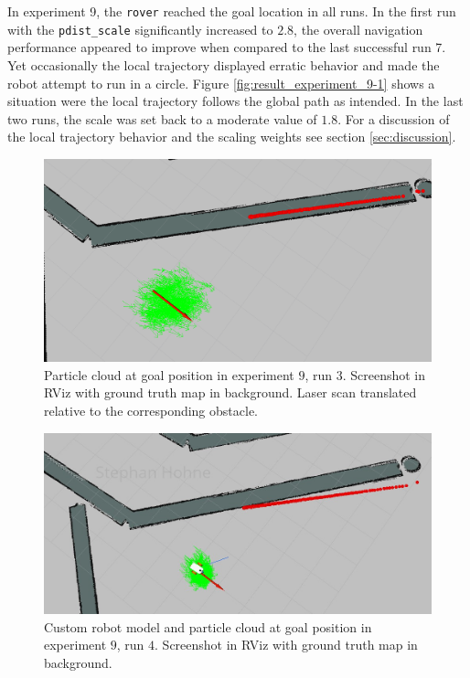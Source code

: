 \documentclass[10pt,journal,compsoc]{IEEEtran}
\begin{document}
In experiment 9, the \texttt{rover} reached the goal location in all runs. In the first run with the \texttt{pdist\_scale} significantly increased to $2.8$, the overall navigation performance appeared to improve when compared to the last successful run 7. Yet occasionally the local trajectory displayed erratic behavior and made the robot attempt to run in a circle. Figure \ref{fig:result_experiment_9-1} shows a situation were the local trajectory follows the global path as intended. In the last two runs, the scale was set back to a moderate value of $1.8$. For a discussion of the local trajectory behavior and the scaling weights see section \ref{sec:discussion}.
\begin{figure}[thpb]
	\centering
    \includegraphics[width=\linewidth]{images/exp9_run3_goal.PNG}
    \caption{Particle cloud at goal position in experiment $9$, run $3$. Screenshot in RViz with ground truth map in background. Laser scan translated relative to the corresponding obstacle.}
    \label{fig:result_experiment_9-3}
\end{figure}

\begin{figure}[thpb]
	\centering
    \includegraphics[width=\linewidth]{images/exp9_run4_goal_signed.PNG}
    \caption{Custom robot model and particle cloud at goal position in experiment $9$, run $4$. Screenshot in RViz with ground truth map in background.}
	\label{fig:result_experiment_9-4}
\end{figure}
\end{document}
